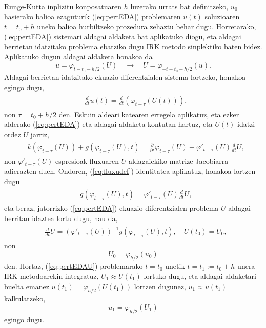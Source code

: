  Runge-Kutta inplizitu konposatuaren $h$ luzerako urrats bat definitzeko,  $u_0$ hasierako balioa ezaguturik (\ref{eq:pertEDA}) problemaren $u(t)$ soluzioaren $t=t_0+h$ uneko balioa hurbiltzeko prozedura zehaztu behar dugu. Horretarako,  (\ref{eq:pertEDA})  sistemari aldagai aldaketa bat aplikatuko diogu, eta aldagai berrietan idatzitako problema ebatziko dugu IRK metodo sinplektiko baten bidez. Aplikatuko dugun aldagai aldaketa honakoa da
\begin{equation*}
u = \varphi_{t-t_0-h/2}(U) \quad \to \quad U = \varphi_{-t+t_0+h/2}(u).
\end{equation*}
%
Aldagai berrietan idatzitako ekuazio diferentzialen sistema lortzeko, honakoa egingo dugu,
\begin{align}
\begin{split}
&\frac{d}{dt}u(t) = \frac{d}{dt}\left(\varphi_{t-\tau}(U(t))\right),
\end{split}
\end{align}
%
non $\tau = t_0+h/2$ den.
Eskuin aldeari katearen erregela aplikatuz, eta ezker alderako (\ref{eq:pertEDA}) eta aldagai aldaketa kontutan hartuz, eta $U(t)$ idatzi ordez $U$ jarriz,
\begin{align}
\begin{split}
&k\left(\varphi_{t-\tau}(U)\right) + g\left(\varphi_{t-\tau}(U),t \right) = \frac{\partial}{\partial t} \varphi_{t-\tau}(U) + \varphi'_{t-\tau}(U) \frac{d}{dt}U,
\end{split}
\end{align}
non $\varphi'_{t-\tau}(U)$ espresioak fluxuaren $U$ aldagaiekiko matrize Jacobiarra adierazten duen. Ondoren, (\ref{eq:fluxudef}) identitatea aplikatuz, honakoa lortzen dugu
\begin{align}
\begin{split}
&g\left(\varphi_{t-\tau}(U),t \right) =   \varphi'_{t-\tau}(U) \frac{d}{dt}U,
\end{split}
\end{align}
%
eta beraz, jatorrizko (\ref{eq:pertEDA}) ekuazio diferentzialen problema $U$ aldagai berritan idaztea lortu dugu, hau da,
\begin{align}
\begin{split}
\label{eq:pertEDAU}
&\frac{d}{dt} U = \left(\varphi'_{t-\tau}(U)\right)^{-1} g\left(\varphi_{t-\tau}(U),t \right), \quad U(t_0) = U_0,
\end{split}
\end{align}
%
non
\begin{equation*}
U_0 = \varphi_{h/2}(u_0)
\end{equation*}
%
den.  Hortaz, (\ref{eq:pertEDAU}) problemarako $t=t_0$ unetik $t=t_1:=t_0 + h$ unera IRK metodoarekin integratuz, $U_1 \approx U(t_1)$ lortuko dugu, eta
aldagai aldaketari buelta emanez $u(t_1) = \varphi_{h/2}(U(t_1))$ lortzen dugunez, $u_1 \approx u(t_1)$ kalkulatzeko,
\begin{equation*}
u_1 = \varphi_{h/2}(U_1)
\end{equation*}
%
egingo dugu.

